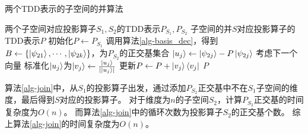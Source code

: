 \begin{algorithm}
    \caption{两个TDD表示的子空间的并算法}
    \label{alg-join} %
    \begin{algorithmic}[1] %
        \Require 两个子空间对应投影算子$S_1 , S_2$的TDD表示$P_{S_1},P_{S_2}$
        \Ensure 子空间的并$S$对应投影算子的TDD表示$P$
        \State 初始化$P \gets P_{S_1}$
        \State 调用算法\ref{alg-basis_dec}，得到 $B\gets \{\ket{\psi_{21}},\cdots,\ket{\psi_{2k}}\}$，为$P_{S_2}$的正交基集合
            \State $\ket{u_j} \gets \ket{\psi_{2j}} - P\ket{\psi_{2j}}$
                \State 考虑下一个向量
            \Else
                \State 标准化$\ket{u_j}$为$\ket{v_j} \gets \frac{\ket{u_j}}{|\ket{u_j}|}$
                \State 更新$P\gets P + \ket{v_j}\bra{v_j}$
            \EndIf
        \EndFor
        \State \Return $P$
    \end{algorithmic}
\end{algorithm}

算法\ref{alg-join}中，从$S_1$的投影算子出发，通过添加$P_{S_2}$正交基中不在$S_1$子空间的维度，最后得到$S$对应的投影算子。
对于维度为$n$的子空间$S_2$，计算$P_{S_2}$正交基的时间复杂度为$O(n)$。
而算法\ref{alg-join}中的循环次数为投影算子$S_2$的正交基个数。
综上算法\ref{alg-join}的时间复杂度为$O(n)$。

